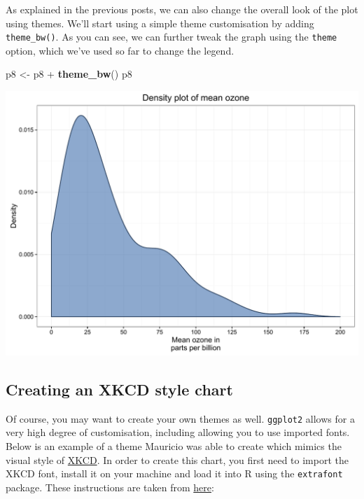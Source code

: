 \documentclass[]{article}
\newenvironment{Shaded}{\begin{snugshade}}{\end{snugshade}}
\newcommand{\KeywordTok}[1]{\textcolor[rgb]{0.13,0.29,0.53}{\textbf{{#1}}}}
\newcommand{\StringTok}[1]{\textcolor[rgb]{0.31,0.60,0.02}{{#1}}}
\newcommand{\NormalTok}[1]{{#1}}
\begin{document}
As explained in the previous posts, we can also change the overall look
of the plot using themes. We'll start using a simple theme customisation
by adding \texttt{theme\_bw()}. As you can see, we can further tweak the
graph using the \texttt{theme} option, which we've used so far to change
the legend.

\begin{Shaded}
\begin{Highlighting}[]
\NormalTok{p8 <-}\StringTok{ }\NormalTok{p8 +}\StringTok{ }\KeywordTok{theme_bw}\NormalTok{()}
\NormalTok{p8}
\end{Highlighting}
\end{Shaded}

\begin{center}\includegraphics{0_all_posts_pdf/density_9-1} \end{center}

\subsection{Creating an XKCD style
chart}\label{creating-an-xkcd-style-chart-7}

Of course, you may want to create your own themes as well.
\texttt{ggplot2} allows for a very high degree of customisation,
including allowing you to use imported fonts. Below is an example of a
theme Mauricio was able to create which mimics the visual style of
\href{http://xkcd.com/}{XKCD}. In order to create this chart, you first
need to import the XKCD font, install it on your machine and load it
into R using the \texttt{extrafont} package. These instructions are
taken from
\href{https://www.google.com.au/url?sa=t\&rct=j\&q=\&esrc=s\&source=web\&cd=1\&ved=0ahUKEwiWzafchdPJAhVBpJQKHe_LDT8QFggbMAA\&url=https\%3A\%2F\%2Fcran.r-project.org\%2Fweb\%2Fpackages\%2Fxkcd\%2Fvignettes\%2Fxkcd-intro.pdf\&usg=AFQjCNE-KciGY14e-Q1buYIVmTFC0ht__Q\&sig2=DZUwkvIHwfNWtTtkcz94jg}{here}:
\end{document}
